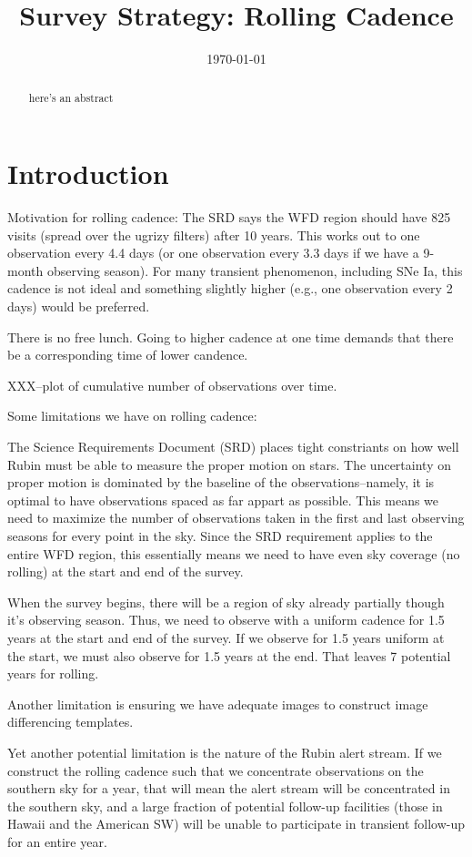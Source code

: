 \documentclass[modern]{aastex62}
\begin{document}

\date{\today}
\title{Survey Strategy: Rolling Cadence}

\begin{abstract}
here's an abstract
\end{abstract}

\section{Introduction}

Motivation for rolling cadence:  The SRD says the WFD region should have 825 visits (spread over the ugrizy filters) after 10 years. This works out to one observation every 4.4 days (or one observation every 3.3 days if we have a 9-month observing season). For many transient phenomenon, including SNe Ia, this cadence is not ideal and something slightly higher (e.g., one observation every 2 days) would be preferred.

There is no free lunch. Going to higher cadence at one time demands that there be a corresponding time of lower candence.

XXX--plot of cumulative number of observations over time.


Some limitations we have on rolling cadence:

The Science Requirements Document (SRD) places tight constriants on how well Rubin must be able to measure the proper motion on stars. The uncertainty on proper motion is dominated by the baseline of the observations--namely, it is optimal to have observations spaced as far appart as possible. This means we need to maximize the number of observations taken in the first and last observing seasons for every point in the sky. Since the SRD requirement applies to the entire WFD region, this essentially means we need to have even sky coverage (no rolling) at the start and end of the survey. 

When the survey begins, there will be a region of sky already partially though it's observing season. Thus, we need to observe with a uniform cadence for 1.5 years at the start and end of the survey. If we observe for 1.5 years uniform at the start, we must also observe for 1.5 years at the end. That leaves 7 potential years for rolling. 


Another limitation is ensuring we have adequate images to construct image differencing templates. 

Yet another potential limitation is the nature of the Rubin alert stream. If we construct the rolling cadence such that we concentrate observations on the southern sky for a year, that will mean the alert stream will be concentrated in the southern sky, and a large fraction of potential follow-up facilities (those in Hawaii and the American SW) will be unable to participate in transient follow-up for an entire year.
\end{document}
